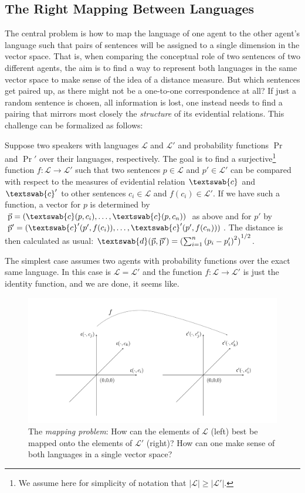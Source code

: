 \documentclass[11pt, a4paper]{scrartcl}
\renewcommand{\i}[1]{\emph{#1}}
\renewcommand{\L}{\mathcal{L}}
\renewcommand{\v}[1]{\vec{\mathrm{#1}}}
\newcommand{\m}[1]{\textswab{#1}}
\begin{document}
\subsection{The Right Mapping Between Languages}

The central problem is how to map the language of one agent to the other agent's language such that pairs of sentences will be assigned to a single dimension in the vector space. That is, when comparing the conceptual role of two sentences of two different agents, the aim is to find a way to represent both languages in the same vector space to make sense of the idea of a distance measure. But which sentences get paired up, as there might not be a one-to-one correspondence at all? If just a random sentence is chosen, all information is lost, one instead needs to find a pairing that mirrors most closely the \i{structure} of its evidential relations. This challenge can be formalized as follows:

Suppose two speakers with languages $\L$ and $\L'$ and probability functions $\Pr$ and $\Pr'$ over their languages, respectively. The goal is to find a surjective\footnote{We assume here for simplicity of notation that $|\L| \geqslant |\L'|$.} function ${f: \L \rightarrow \L'}$ such that two sentences $p \in \L$ and $p' \in \L'$ can be compared with respect to the measures of evidential relation $\m{c}$ and $\m{c}'$ to other sentences $c_i \in \L$ and $f(c_i) \in \L'$. If we have such a function, a vector for $p$ is determined by $\v{p} = (\m{c}(p,c_i),\ldots,\m{c}(p,c_n))$ as above and for $p'$ by $\v{p}' = (\m{c}'(p',f(c_i)),\ldots,\m{c}'(p',f(c_n)))$. The distance is then calculated as usual: $\m{d}(\v{p},\v{p}')= {( \sum_{i=1}^n {(p_i-p_i')}^2 )}^{1/2}$.  

The simplest case assumes two agents with probability functions over the exact same language. In this case is $\L = \L'$ and the function $f: \L \rightarrow \L'$ is just the identity function, and we are done, it seems like.

\begin{figure}
	\centering
    \includegraphics[width=\textwidth]{Mapping.png}
    \caption{The \i{mapping problem}: How can the elements of $\L$ (left) best be mapped onto the elements of $\L'$ (right)? How can one make sense of both languages in a single vector space?\label{fig:mapping}}
\end{figure}
\end{document}
